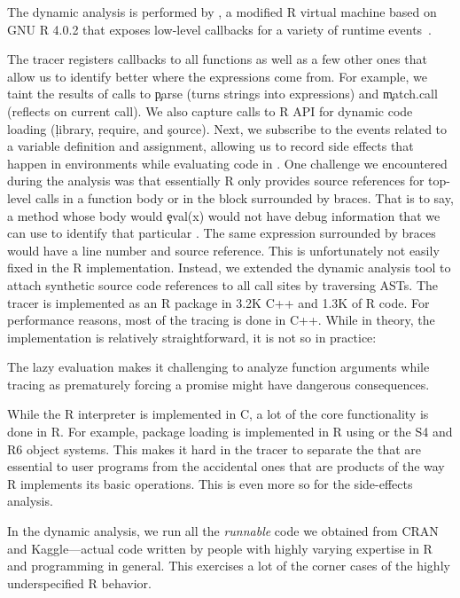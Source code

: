 \documentclass[review,screen,acmsmall,anonymous=true]{acmart}
\begin{document}
The dynamic analysis is performed by \rdyntrace, a modified R virtual machine
based on GNU R 4.0.2 that exposes low-level callbacks for a variety of runtime
events~\cite{oopsla19b}.

The tracer registers callbacks to all \eval functions as well as a few other
ones that allow us to identify better where the expressions come from. For
example, we taint the results of calls to \c{parse} (turns strings into
expressions) and \c{match.call} (reflects on current call). We also capture calls
to R API for dynamic code loading (\eg\xspace \c{library}, \c{require}, and
\c{source}). Next, we subscribe to the events related to a variable definition
and assignment, allowing us to record side effects that happen in environments
while evaluating code in \eval. One challenge we encountered during the analysis
was that essentially R only provides source references for top-level calls in a
function body or in the block surrounded by braces. That is to say, a method
whose body would \c{eval(x)} would not have debug information that we can use to
identify that particular \eval. The same expression surrounded by braces would
have a line number and source reference. This is unfortunately not easily fixed
in the R implementation. Instead, we extended the dynamic analysis tool to
attach synthetic source code references to all \eval call sites by traversing
ASTs. The tracer is implemented as an R package in 3.2K C++ and 1.3K of R code.
For performance reasons, most of the tracing is done in C++. While in theory, the
implementation is relatively straightforward, it is not so in practice:
%
\begin{compactitem}[---]

\item The lazy evaluation makes it challenging to analyze function arguments
  while tracing as prematurely forcing a promise might have dangerous
  consequences.

\item While the R interpreter is implemented in C, a lot of the core
  functionality is done in R. For example, package loading is implemented in R
  using \eval or the S4 and R6 object systems. This makes it hard in the tracer
  to separate the \eval that are essential to user programs from the
  accidental ones that are products of the way R implements its basic
  operations. This is even more so for the side-effects analysis.

\item In the dynamic analysis, we run all the \emph{runnable} code we obtained
  from CRAN and Kaggle---\ie actual code written by people with highly varying
  expertise in R and programming in general. This exercises a lot of the corner
  cases of the highly underspecified R behavior.

\end{compactitem}
\end{document}
